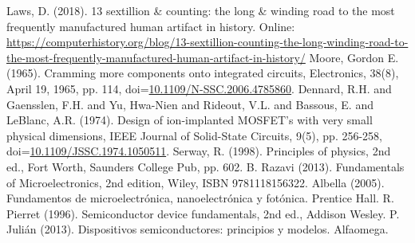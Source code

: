 \begin{thebibliography}{00}
 Laws, D. (2018). 13 sextillion \& counting: the long \& winding road to the most frequently manufactured human artifact in history. Online: \url{https://computerhistory.org/blog/13-sextillion-counting-the-long-winding-road-to-the-most-frequently-manufactured-human-artifact-in-history/}
 Moore, Gordon E. (1965). Cramming more components onto integrated circuits, Electronics, 38(8), April 19, 1965, pp. 114, doi=\href{https://dx.doi.org/10.1109/N-SSC.2006.4785860}{10.1109/N-SSC.2006.4785860}.
 Dennard, R.H. and Gaensslen, F.H. and Yu, Hwa-Nien and Rideout, V.L. and Bassous, E. and LeBlanc, A.R. (1974). Design of ion-implanted MOSFET's with very small physical dimensions, IEEE Journal of Solid-State Circuits, 9(5), pp. 256-258, doi=\href{https://dx.doi.org/10.1109/JSSC.1974.1050511}{10.1109/JSSC.1974.1050511}.
 Serway, R. (1998). Principles of physics, 2nd ed., Fort Worth, Saunders College Pub, pp. 602.
 B. Razavi (2013). Fundamentals of Microelectronics, 2nd edition, Wiley, ISBN 9781118156322.
 Albella (2005). Fundamentos de microelectrónica, nanoelectrónica y fotónica. Prentice Hall.
 R. Pierret (1996). Semiconductor device fundamentals, 2nd ed., Addison Wesley.
 P. Julián (2013). Dispositivos semiconductores: principios y modelos. Alfaomega.
\end{thebibliography}
